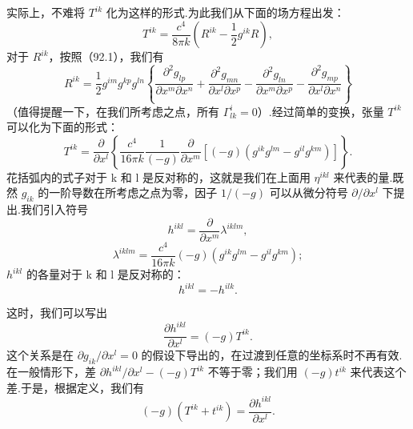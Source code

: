 实际上，不难将 $T^{ik}$ 化为这样的形式.为此我们从下面的场方程出发：
\begin{equation*}
  T^{ik}=\frac{c^4}{8\pi k}\left(R^{ik}-\frac{1}{2}g^{ik}R\right),
\end{equation*}
对于 $R^{ik}$，按照（92.1），我们有
\begin{equation*}
  R^{ik}=\frac{1}{2}g^{im}g^{kp}g^{ln}\left\{
  \frac{\partial^2 g_{lp}}{\partial x^m\partial x^n}
  +\frac{\partial^2 g_{mn}}{\partial x^l\partial x^p}
  -\frac{\partial^2 g_{ln}}{\partial x^m\partial x^p}
  -\frac{\partial^2 g_{mp}}{\partial x^l\partial x^n}\right\}
\end{equation*}
（值得提醒一下，在我们所考虑之点，所有 $\Gamma^i_{lk}=0$）.经过简单的变换，张量 $T^{ik}$ 可以化为下面的形式：
\begin{equation*}
  T^{ik}=\frac{\partial}{\partial x^l}\left\{
  \frac{c^4}{16\pi k}\frac{1}{(-g)}
  \frac{\partial}{\partial x^m}
  \left[(-g)\left(g^{ik}g^{lm}-g^{il}g^{km}\right)\right]\right\}.
\end{equation*}
花括弧内的式子对于 k 和 l 是反对称的，这就是我们在上面用 $\eta^{ikl}$ 来代表的量.既然 $g_{ik}$ 的一阶导数在所考虑之点为零，因子 $1/(-g)$ 可以从微分符号 $\partial/\partial x^l$ 下提出.我们引入符号
\begin{equation}
  h^{ikl}=\frac{\partial}{\partial x^m}\lambda^{iklm},
\end{equation}
\begin{equation}
  \lambda^{iklm}=\frac{c^4}{16\pi k}(-g)
  \left(g^{ik}g^{lm}-g^{il}g^{km}\right);
\end{equation}
$h^{ikl}$ 的各量对于 k 和 l 是反对称的：
\begin{equation}
  h^{ikl}=-h^{ilk}.
\end{equation}

这时，我们可以写出
\begin{equation*}
  \frac{\partial h^{ikl}}{\partial x^l}=(-g)T^{ik}.
\end{equation*}
这个关系是在 $\partial g_{ik}/\partial x^l=0$ 的假设下导出的，在过渡到任意的坐标系时不再有效.在一般情形下，差 $\partial h^{ikl}/\partial x^l-(-g)T^{ik}$ 不等于零；我们用 $(-g)t^{ik}$ 来代表这个差.于是，根据定义，我们有
\begin{equation}
  (-g)\left(T^{ik}+t^{ik}\right)=\frac{\partial h^{ikl}}{\partial x^l}.
\end{equation}

